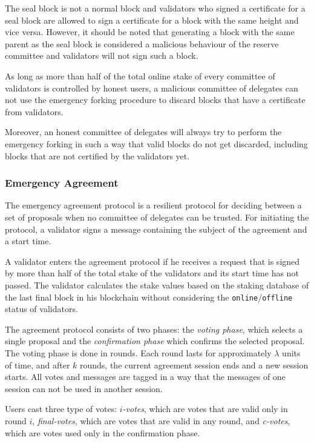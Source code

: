 The seal block is not a normal block and validators who signed a certificate for a seal block are allowed
to sign a certificate for a block with the same height and vice versa. However, it should be noted that
generating a block with the same parent as the seal block is considered a malicious behaviour of the reserve
committee and validators will not sign such a block.

As long as more than half of the total online stake of every committee of validators is controlled
by honest users, a malicious committee of delegates can not use the emergency forking procedure to discard blocks
that have a certificate from validators.

Moreover, an honest committee of delegates will always try to perform the emergency forking in such a way that
valid blocks do not get discarded, including blocks that are not certified by the validators yet.

\subsubsection{Emergency Agreement}

The emergency agreement protocol is a resilient protocol for deciding between a set of proposals when no committee of
delegates can be trusted. For initiating the protocol, a validator signs a message containing the subject
of the agreement and a start time.

A validator enters the agreement protocol if he
receives a request that is signed by more than half of the total stake
of the validators and its start time has not passed. The validator calculates
the stake values based on the staking database of the last final block in his blockchain without
considering the \texttt{online}/\texttt{offline} status of validators.

The agreement protocol consists of two phases: the \emph{voting phase}, which selects a single proposal
and the \emph{confirmation phase} which confirms the selected proposal. The voting phase is done in rounds.
Each round lasts for approximately $\lambda$ units of time, and after $k$ rounds, the current agreement session ends and a
new session starts. All votes and messages are tagged in a way that the messages of one session can
not be used in another session.

Users cast three type of votes: \emph{$i$-votes}, which are votes that are valid only in
round $i$, \emph{final-votes}, which are votes that are valid in any round, and \emph{c-votes}, which are votes
used only in the confirmation phase.

